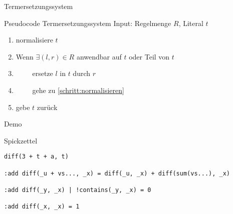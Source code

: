 \documentclass{beamer}
\begin{document}

\begin{frame}[fragile]{Termersetzungssystem}
	\begin{block}{Pseudocode Termersetzungssystem}
		Input: Regelmenge $R$, Literal $t$ \\
		
		\begin{enumerate}
			\item normalisiere $t$ \label{schritt:normalisieren}
			\item Wenn $\exists (l, r) \in R$ anwendbar auf $t$ oder Teil von $t$
			\item ~~~~ ersetze $l$ in $t$ durch $r$
			\item ~~~~ gehe zu \ref{schritt:normalisieren}
			\item gebe $t$ zurück
		\end{enumerate}
	\end{block}
\end{frame}


\begin{frame}[fragile]{Demo}
	\pause
	\begin{block}{Spickzettel}
		\footnotesize
		\begin{verbatim}
diff(3 + t + a, t)

:add diff(_u + vs..., _x) = diff(_u, _x) + diff(sum(vs...), _x)

:add diff(_y, _x) | !contains(_y, _x) = 0

:add diff(_x, _x) = 1
		\end{verbatim}
	\end{block}
\end{frame}

\end{document}
